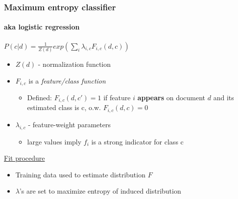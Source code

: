 \documentclass{beamer}
\begin{document}
\begin{frame}
	\frametitle{Maximum entropy classifier}
	\framesubtitle{aka logistic regression}
	\begin{Definition}
		$P(c|d) = \frac{1}{Z(d)} exp(\sum_{i}\lambda_{i,c}F_{i,c}(d,c))$
	\end{Definition}
	\begin{itemize}
		\pause
		\item $Z(d)$ - normalization function
		\pause
		\item $F_{i,c}$ is a \emph{feature/class function}\
		\pause
		\begin{itemize}
			\item Defined: $F_{i,c}(d,c') = 1$ if feature $i$ \textbf{appears} on document $d$ and its estimated class is c, o.w. $F_{i,c}(d,c) = 0$
		\end{itemize}
		\pause
		\item $\lambda_{i,c}$ - feature-weight parameters 
		\begin{itemize}
			\item large values imply $f_i$ is a strong indicator for class c
		\end{itemize}

	\end{itemize}
	
	\pause
	\underline{Fit procedure}
	\begin{itemize}
		\item Training data used to estimate distribution $F$
		\item $\lambda$'s are set to maximize entropy of induced distribution
	\end{itemize}
			
\end{frame}
\end{document}

